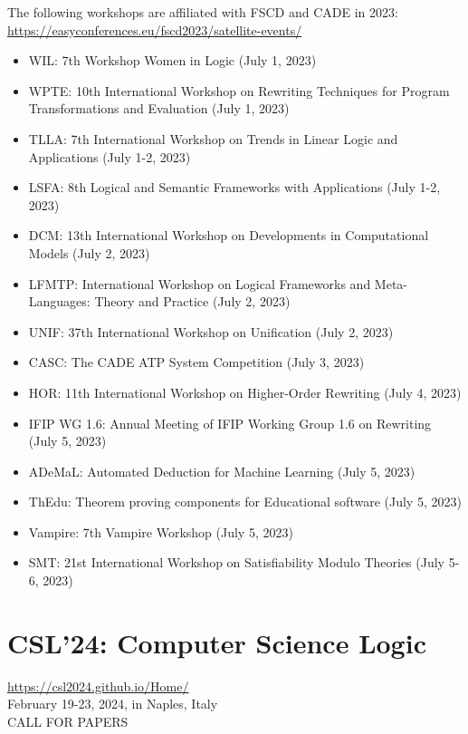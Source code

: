 \documentclass[prodmode,acmtecs]{acmsmall} %
\begin{document}
\begin{itemize}
  The following workshops are affiliated with FSCD and CADE in 2023: \href{https://easyconferences.eu/fscd2023/satellite-events/}{https://easyconferences.eu/fscd2023/satellite-events/} 
 
\begin{itemize}\item  WIL: 7th Workshop Women in Logic (July 1, 2023)
\item  WPTE: 10th International Workshop on Rewriting Techniques for Program Transformations and Evaluation (July 1, 2023)
\item  TLLA: 7th International Workshop on Trends in Linear Logic and Applications (July 1-2, 2023)
\item  LSFA: 8th Logical and Semantic Frameworks with Applications (July 1-2, 2023)
\item  DCM: 13th International Workshop on Developments in Computational Models (July 2, 2023)
\item  LFMTP: International Workshop on Logical Frameworks and Meta-Languages: Theory and Practice (July 2, 2023)
\item  UNIF: 37th International Workshop on Unification (July 2, 2023)
\item  CASC: The CADE ATP System Competition (July 3, 2023)
\item  HOR: 11th International Workshop on Higher-Order Rewriting (July 4, 2023)
\item  IFIP WG 1.6: Annual Meeting of IFIP Working Group 1.6 on Rewriting (July 5, 2023)
\item  ADeMaL: Automated Deduction for Machine Learning (July 5, 2023)
\item  ThEdu: Theorem proving components for Educational software (July 5, 2023)
\item  Vampire: 7th Vampire Workshop (July 5, 2023)
\item  SMT: 21st International Workshop on Satisfiability Modulo Theories (July 5-6, 2023)
\end{itemize} 
\end{itemize}\section{CSL'24: Computer Science Logic }\label{CSL24} \href{https://csl2024.github.io/Home/}{https://csl2024.github.io/Home/}\\ 
 February 19-23, 2024, in Naples, Italy\\ 
CALL FOR PAPERS 
\end{document}
